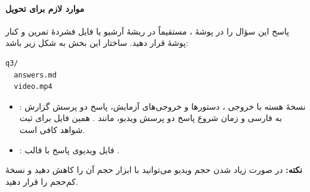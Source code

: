 \paragraph{موارد لازم برای تحویل}
پاسخ این سؤال را در پوشهٔ ، مستقیماً در ریشهٔ آرشیو
یا فایل فشردهٔ تمرین و کنار پوشهٔ  قرار دهید.
ساختار این بخش به شکل زیر باشد:

\begin{latin}
\begin{verbatim}
q3/
  answers.md
  video.mp4
\end{verbatim}
\end{latin}

\begin{itemize}
  \item {}: نسخهٔ هسته با خروجی
  ، دستورها و خروجی‌های آزمایش، پاسخ دو پرسش
  گزارش به فارسی و زمان شروع پاسخ دو پرسش ویدیو، مانند
  . همین فایل برای ثبت شواهد کافی است.
  \item {}: فایل ویدیوی پاسخ با قالب .
\end{itemize}

\textbf{نکته:} در صورت زیاد شدن حجم ویدیو می‌توانید با ابزار
 حجم آن را کاهش دهید و نسخهٔ کم‌حجم را قرار دهید.

